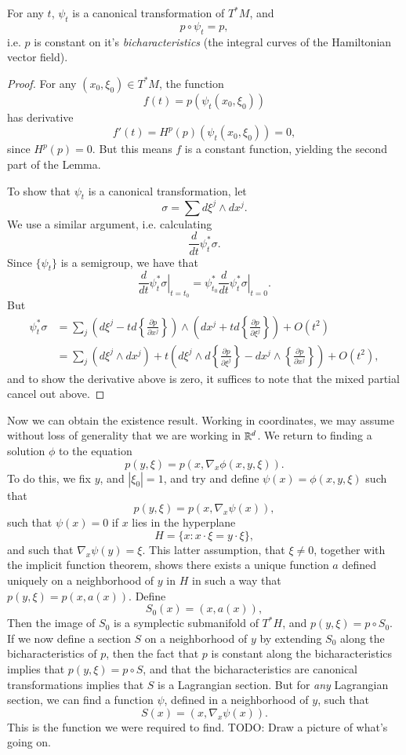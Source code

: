 \begin{lemma}
    For any $t$, $\psi_t$ is a canonical transformation of $T^* M$, and
    \[ p \circ \psi_t = p, \]
    i.e. $p$ is constant on it's \emph{bicharacteristics} (the integral curves of the Hamiltonian vector field).
\end{lemma}
\begin{proof}
    For any $(x_0,\xi_0) \in T^* M$, the function
    \[ f(t) = p(\psi_t(x_0,\xi_0)) \]
    has derivative
    \[ f'(t) = H^p(p)(\psi_t(x_0,\xi_0)) = 0, \]
    since $H^p(p) = 0$. But this means $f$ is a constant function, yielding the second part of the Lemma.

    To show that $\psi_t$ is a canonical transformation, let
    \[ \sigma = \sum d\xi^j \wedge dx^j. \]
    We use a similar argument, i.e. calculating
    \[ \frac{d}{dt} \psi_t^* \sigma. \]
    Since $\{ \psi_t \}$ is a semigroup, we have that
    \[ \frac{d}{dt} \left. \psi_t^* \sigma \right|_{t = t_0} = \psi_{t_0}^* \frac{d}{dt} \left. \psi_t^* \sigma \right|_{t = 0}. \]
    But
    \begin{align*}
        \psi_t^* \sigma &= \sum_j \left( d \xi^j - t d \left\{ \frac{\partial p}{\partial x^j} \right\} \right) \wedge \left( dx^j + t d \left\{ \frac{\partial p}{\partial \xi^j} \right\} \right) + O(t^2)\\
        &= \sum_j (d\xi^j \wedge dx^j) + t \left( d\xi^j \wedge d \left\{ \frac{\partial p}{\partial \xi^j} \right\} - dx^j \wedge \left\{ \frac{\partial p}{\partial x^j} \right\} \right) + O(t^2),
    \end{align*}
    and to show the derivative above is zero, it suffices to note that the mixed partial cancel out above.
\end{proof}

Now we can obtain the existence result. Working in coordinates, we may assume without loss of generality that we are working in $\operatorname{\mathbb{R}}^d$. We return to finding a solution $\phi$ to the equation
%
\[ p(y,\xi) = p(x,\nabla_x \phi(x,y,\xi)). \]
%
To do this, we fix $y$, and $|\xi_0| = 1$, and try and define $\psi(x) = \phi(x,y,\xi)$ such that
%
\[ p(y,\xi) = p(x, \nabla_x \psi(x)), \]
%
such that $\psi(x) = 0$ if $x$ lies in the hyperplane
%
\[ H = \{ x : x \cdot \xi = y \cdot \xi \}, \]
%
and such that $\nabla_x \psi(y) = \xi$. This latter assumption, that $\xi \neq 0$, together with the implicit function theorem, shows there exists a unique function $a$ defined uniquely on a neighborhood of $y$ in $H$ in such a way that $p(y,\xi) = p(x, a(x))$. Define
%
\[ S_0(x) = (x,a(x)), \]
%
Then the image of $S_0$ is a symplectic submanifold of $T^* H$, and $p(y,\xi) = p \circ S_0$. If we now define a section $S$ on a neighborhood of $y$ by extending $S_0$ along the bicharacteristics of $p$, then the fact that $p$ is constant along the bicharacteristics implies that $p(y,\xi) = p \circ S$, and that the bicharacteristics are canonical transformations implies that $S$ is a Lagrangian section. But for \emph{any} Lagrangian section, we can find a function $\psi$, defined in a neighborhood of $y$, such that
%
\[ S(x) = ( x, \nabla_x \psi(x) ). \]
%
This is the function we were required to find. TODO: Draw a picture of what's going on.

